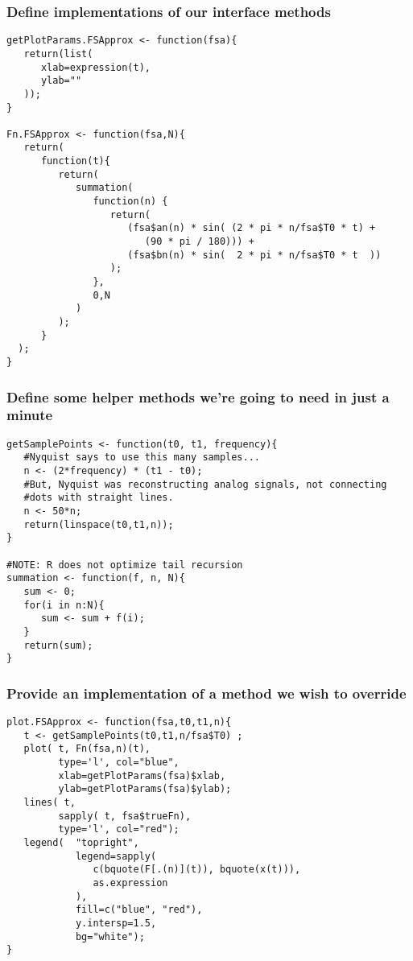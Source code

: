 \documentclass{beamer}
\begin{document}
\begin{frame}[fragile]
   \frametitle{Define implementations of our interface methods}
   \begin{center}
   \begin{minipage}{100mm}
   \begin{lstlisting}
getPlotParams.FSApprox <- function(fsa){
   return(list(
      xlab=expression(t),
      ylab=""
   ));
}

Fn.FSApprox <- function(fsa,N){
   return(
      function(t){
         return(
            summation(
               function(n) {
                  return(
                     (fsa$an(n) * sin( (2 * pi * n/fsa$T0 * t) + 
                        (90 * pi / 180))) +
                     (fsa$bn(n) * sin(  2 * pi * n/fsa$T0 * t  )) 
                  );
               }, 
               0,N
            )
         );
      }
  );
}
   \end{lstlisting}
   \end{minipage}
   \end{center}
\end{frame}

\begin{frame}[fragile]
   \frametitle{Define some helper methods we're going to need in just a minute}
   \begin{center}
   \begin{minipage}{100mm}
   \begin{lstlisting}
getSamplePoints <- function(t0, t1, frequency){
   #Nyquist says to use this many samples...
   n <- (2*frequency) * (t1 - t0);
   #But, Nyquist was reconstructing analog signals, not connecting 
   #dots with straight lines.
   n <- 50*n;
   return(linspace(t0,t1,n));
}

#NOTE: R does not optimize tail recursion
summation <- function(f, n, N){
   sum <- 0;
   for(i in n:N){
      sum <- sum + f(i);
   }
   return(sum);
}
   \end{lstlisting}
   \end{minipage}
   \end{center}
\end{frame}

\begin{frame}[fragile]
   \frametitle{Provide an implementation of a method we wish to override}
   \begin{center}
   \begin{minipage}{100mm}
   \begin{lstlisting}
plot.FSApprox <- function(fsa,t0,t1,n){
   t <- getSamplePoints(t0,t1,n/fsa$T0) ;
   plot( t, Fn(fsa,n)(t), 
         type='l', col="blue", 
         xlab=getPlotParams(fsa)$xlab, 
         ylab=getPlotParams(fsa)$ylab);
   lines( t, 
         sapply( t, fsa$trueFn),
         type='l', col="red");
   legend(  "topright", 
            legend=sapply(
               c(bquote(F[.(n)](t)), bquote(x(t))),
               as.expression
            ), 
            fill=c("blue", "red"),
            y.intersp=1.5,
            bg="white");
}
   \end{lstlisting}
   \end{minipage}
   \end{center}
\end{frame}
\end{document}
